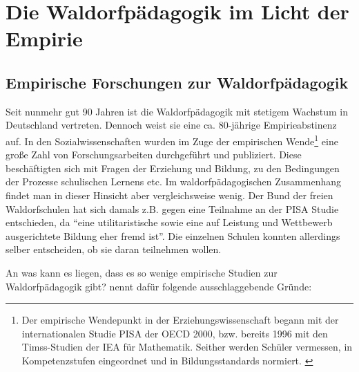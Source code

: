 \section{Die Waldorfpädagogik im Licht der Empirie}
\subsection{Empirische Forschungen zur Waldorfpädagogik} %
\label{sub:empirische_forschung}


Seit nunmehr gut 90 Jahren ist die Waldorfpädagogik mit stetigem Wachstum in Deutschland vertreten. Dennoch weist sie eine ca. 80-jährige Empirieabstinenz auf. In den Sozialwissenschaften wurden im Zuge der empirischen Wende\footnote{Der empirische Wendepunkt in der Erziehungswissenschaft begann mit der internationalen Studie PISA der OECD 2000, bzw. bereits 1996 mit den Timss-Studien der IEA für Mathematik. Seither werden Schüler vermessen, in Kompetenzstufen eingeordnet und in Bildungsstandards normiert. \citep[Vgl.][]{arp11}} eine große Zahl von Forschungsarbeiten durchgeführt und publiziert. Diese beschäftigten sich mit Fragen der Erziehung und Bildung, zu den Bedingungen der Prozesse schulischen Lernens etc. Im waldorfpädagogischen Zusammenhang findet man in dieser Hinsicht aber vergleichsweise wenig. Der Bund der freien Waldorfschulen hat sich damals z.B. gegen eine Teilnahme an der PISA Studie entschieden, da \enquote{eine utilitaristische sowie eine auf Leistung und Wettbewerb ausgerichtete Bildung eher fremd ist}. \citep[Vgl.][s.127ff]{paschen10}  Die einzelnen Schulen konnten allerdings selber entscheiden, ob sie daran teilnehmen wollen.


An was kann es liegen, dass es so wenige empirische Studien zur Waldorfpädagogik gibt? \cite[S. 127f]{paschen10} nennt dafür folgende ausschlaggebende Gründe:


